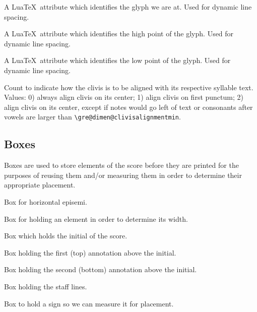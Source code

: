 A Lua\TeX\ attribute which identifies the glyph we are at.  Used for dynamic line spacing.

A Lua\TeX\ attribute which identifies the high point of the glyph.  Used for dynamic line spacing.

A Lua\TeX\ attribute which identifies the low point of the glyph.  Used for dynamic line spacing.

Count to indicate how the clivis is to be aligned with its respective syllable text.  Values: 0) always align clivis on its center; 1) align clivis on first punctum; 2) align clivis on its center, except if notes would go left of text or consonants after vowels are larger than \verb=\gre@dimen@clivisalignmentmin=.



\subsection{Boxes}

Boxes are used to store elements of the score before they are printed for the purposes of reusing them and/or measuring them in order to determine their appropriate placement.

Box for horizontal episemi.

Box for holding an element in order to determine its width.

Box which holds the initial of the score.

Box holding the first (top) annotation above the initial.

Box holding the second (bottom) annotation above the initial.

Box holding the staff lines.

Box to hold a sign so we can measure it for placement.

